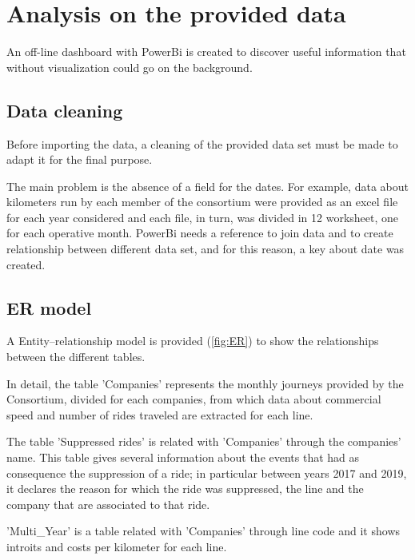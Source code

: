 \chapter{Analysis on the provided data}
\label{ch:dashboard}
An off-line dashboard with PowerBi is created to discover useful information that without visualization could go on the background.

\section{Data cleaning}
Before importing the data, a cleaning of the provided data set must be made to adapt it for the final purpose. 

The main problem is the absence of a field for the dates. For example, data about kilometers run by each member of the consortium were provided as an excel file for each year considered and each file, in turn, was divided in 12 worksheet, one for each operative month. PowerBi needs a reference to join data and to create relationship between different data set, and for this reason, a key about date was created.  

\section{ER model}
A Entity–relationship model is provided (\ref{fig:ER}) to show the relationships between the different tables.

In detail, the table 'Companies' represents the monthly journeys provided by the Consortium, divided for each companies, from which data about commercial speed and number of rides traveled are extracted for each line. 

The table 'Suppressed rides' is related with 'Companies' through the companies' name. This table gives several information about the events that had as consequence the suppression of a ride; in particular between years 2017 and 2019, it declares the reason for which the ride was suppressed, the line and the company that are associated to that ride. 

'Multi\_Year' is a table related with 'Companies' through line code and it shows introits and costs per kilometer for each line. 

